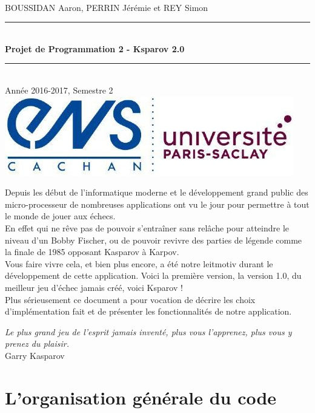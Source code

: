 \documentclass[a4paper]{article}
\newcommand{\HRule}{\rule{\linewidth}{0.5mm}}
\begin{document}
\begin{titlepage}
~\\
BOUSSIDAN Aaron, PERRIN Jérémie et REY Simon\\[5cm]
\begin{center}
\HRule
\\[0.4cm]{\huge\bfseries Projet de Programmation 2 - Ksparov 2.0\\[0.4cm]}
\HRule \\[0.5cm]
Année 2016-2017, Semestre 2\\[12cm]
\includegraphics[scale=0.7]{Images/Logo_ENS_PS.jpg}
\end{center}
\end{titlepage}

Depuis les début de l'informatique moderne et le développement grand public des micro-processeur de nombreuses applications ont vu le jour pour permettre à tout le monde de jouer aux échecs. \\

En effet qui ne rêve pas de pouvoir s'entraîner sans relâche pour atteindre le niveau d'un Bobby Fischer, ou de pouvoir revivre des parties de légende comme la finale de 1985 opposant Kasparov à Karpov. \\

Vous faire vivre cela, et bien plus encore, a été notre leitmotiv durant le développement de cette application. Voici la première version, la version 1.0, du meilleur jeu d'échec jamais créé, voici Ksparov ! \\

Plus sérieusement ce document a pour vocation de décrire les choix d'implémentation fait et de présenter les fonctionnalités de notre application. 

\begin{flushright}
\textit{Le plus grand jeu de l'esprit jamais inventé, plus vous l'apprenez, plus vous y prenez du plaisir.}\\

Garry Kasparov
\end{flushright}

\section{L'organisation générale du code}
\end{document}
